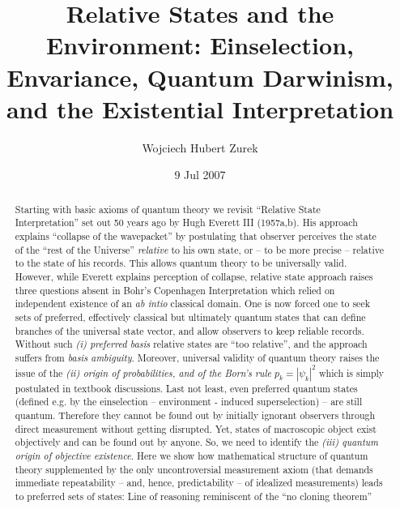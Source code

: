 \documentclass[aps,rmp,epsfig,11pt]{revtex4}
\newcommand{\+}         {\dagger}
\begin{document}
\title{Relative States and the Environment: Einselection, Envariance, Quantum Darwinism, and the Existential Interpretation}

\author{Wojciech Hubert Zurek}

\address{Theory Division, MS B213, LANL
    Los Alamos, NM, 87545, U.S.A.}

\date{9 Jul 2007}

\begin{abstract}
Starting with basic axioms of quantum theory we revisit  ``Relative State Interpretation'' set out 50 years ago by Hugh Everett III (1957a,b). His approach explains ``collapse of the wavepacket'' by postulating 
that observer perceives the state of the ``rest of the Universe'' {\it relative} to his own state, 
or -- to be more precise -- relative to the state of his records. This allows quantum theory to be universally valid. However, while Everett explains perception of collapse, relative state approach raises 
three questions absent in Bohr's Copenhagen Interpretation which relied on independent existence 
of an {\it ab intio} classical domain. One is now forced one to seek sets of preferred, effectively classical but ultimately quantum states that can define branches of the universal state vector, and allow observers to keep reliable records. Without such {\it (i) preferred basis} relative states are ``too relative'', and the approach suffers from {\it basis ambiguity}. Moreover, universal validity of quantum theory 
raises the issue of the {\it (ii) origin of probabilities, and of the Born's rule} $p_k = |\psi_k|^2$ which is simply postulated in textbook discussions. Last not least, even preferred quantum states (defined e.g. by the einselection -- environment - induced superselection) -- are still quantum. Therefore they cannot be found out by initially ignorant observers through direct measurement without getting disrupted. 
Yet, states of macroscopic object exist objectively and can be found out by anyone. So, we need to identify the {\it (iii) quantum origin of objective existence}. Here we show how mathematical structure of quantum theory supplemented by the only uncontroversial measurement axiom (that demands immediate repeatability -- and, hence, predictability -- of idealized measurements) 
leads to preferred sets of states: Line of reasoning reminiscent of the  ``no cloning theorem'' 

\end{abstract}
\end{document}
